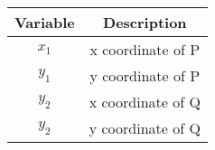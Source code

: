 \begin{tabular}[12pt]{ |c| c|}
    \hline
    \textbf{Variable} & \textbf{Description}\\ 
    \hline
    $x_1$ & x coordinate of P \\
    \hline 
    $y_1$ & y coordinate of P\\
    \hline  
     $y_2$ & x coordinate of Q\\
    \hline  
     $y_2$ & y coordinate of Q\\
    \hline  
    \end{tabular}

